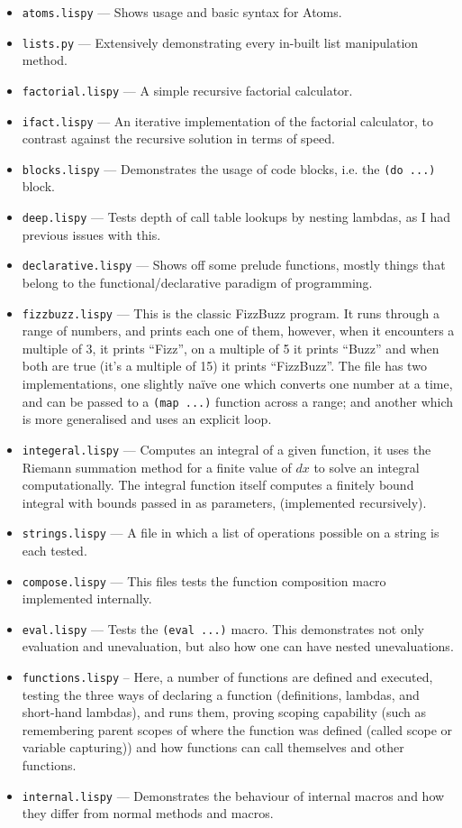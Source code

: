 \documentclass{article}
\newcommand{\code}[1]{\texttt{#1}}
\begin{document}
    \begin{itemize}
      \item \code{atoms.lispy} --- Shows usage and basic syntax for Atoms.
      \item \code{lists.py} --- Extensively demonstrating every in-built
      list manipulation method.
      \item \code{factorial.lispy} --- A simple recursive factorial calculator.
      \item \code{ifact.lispy} --- An iterative implementation of the factorial
      calculator, to contrast against the recursive solution in terms of speed.
      \item \code{blocks.lispy} --- Demonstrates the usage of code blocks, i.e.
      the \code{(do ...)} block.
      \item \code{deep.lispy} --- Tests depth of call table lookups by nesting
      lambdas, as I had previous issues with this.
      \item \code{declarative.lispy} --- Shows off some prelude functions, mostly
      things that belong to the functional/declarative paradigm of programming.
      \item \code{fizzbuzz.lispy} --- This is the classic FizzBuzz program.
      It runs through a range of numbers, and prints each one of them, however,
      when it encounters a multiple of 3, it prints ``Fizz'', on a multiple of
      5 it prints ``Buzz'' and when both are true (it's a multiple of 15)
      it prints ``FizzBuzz''. The file has two implementations, one slightly na\"ive one
      which converts one number at a time, and can be passed to a \code{(map ...)}
      function across a range; and another which is more generalised and uses
      an explicit loop.
      \item \code{integeral.lispy} --- Computes an integral of a given function,
      it uses the Riemann summation method for a finite value of $dx$ to solve
      an integral computationally. The integral function itself computes a
      finitely bound integral with bounds passed in as parameters, (implemented recursively).
      \item \code{strings.lispy} --- A file in which a list of operations possible on
      a string is each tested.
      \item \code{compose.lispy} --- This files tests the function composition macro
      implemented internally.
      \item \code{eval.lispy} --- Tests the \code{(eval ...)} macro. This demonstrates
      not only evaluation and unevaluation, but also how one can have nested unevaluations.
      \item \code{functions.lispy} -- Here, a number of functions are defined
      and executed, testing the three ways of declaring a function (definitions,
      lambdas, and short-hand lambdas), and runs them, proving scoping capability
      (such as remembering parent scopes of where the function was defined (called
      scope or variable capturing)) and how functions can call themselves and other functions.
      \item \code{internal.lispy} --- Demonstrates the behaviour of internal
      macros and how they differ from normal methods and macros.
    \end{itemize}
\end{document}
